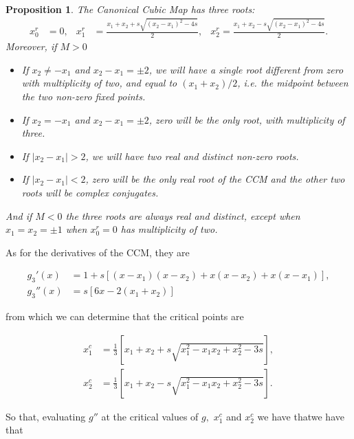 \documentclass[10pt,twoside,titlepage]{book}
\numberwithin{equation}{chapter}
\numberwithin{figure}{chapter}
\numberwithin{table}{chapter}
\theoremstyle{plain}%
\newtheorem{prop}[thm]{Proposition}
\theoremstyle{definition}
\theoremstyle{remark}
\begin{document}
\begin{prop}
	The Canonical Cubic Map has three roots:
	\begin{equation}
		\begin{aligned}
			x_0^r&=0, & x_1^r&=\frac{x_1+x_2+s\sqrt{(x_2-x_1)^2-4s}}{2}, & x_2^r=\frac{x_1+x_2-s\sqrt{(x_2-x_1)^2-4s}}{2}.
		\end{aligned}
	\end{equation}
	Moreover, if $M>0$
	\begin{itemize}
		\item If $x_2\neq-x_1$ and $x_2-x_1=\pm2$, we will have a single root different from zero with multiplicity of two, and equal to $(x_1+x_2)/2$, i.e. the midpoint between the two non-zero fixed points.
		\item If $x_2=-x_1$ and $x_2-x_1=\pm2$, zero will be the only root, with multiplicity of three.
		\item If $\vert x_2-x_1\vert>2$, we will have two real and distinct non-zero roots.
		\item If $\vert x_2-x_1\vert<2$, zero will be the only real root of the CCM and the other two roots will be complex conjugates.
	\end{itemize}
	And if $M<0$ the three roots are always real and distinct, except when $x_1=x_2=\pm1$ when $x_0^r=0$ has multiplicity of two.
\end{prop}

As for the derivatives of the CCM, they are

\begin{equation}
	\begin{aligned}
		g_3'(x)&=1+s\left[(x-x_1)(x-x_2)+x(x-x_2)+x(x-x_1)\right],\\
		g_3''(x)&=s\left[6x-2(x_1+x_2)\right]
	\end{aligned}
\end{equation}

from which we can determine that the critical points are

\begin{equation}
	\begin{aligned}
		x_1^c&= \frac{1}{3}\left[x_1+x_2+s\sqrt{x_1^2-x_1x_2+x_2^2-3s}\right],\\
		x_2^c&= \frac{1}{3}\left[x_1+x_2-s\sqrt{x_1^2-x_1x_2+x_2^2-3s}\right].
	\end{aligned}
\end{equation}

So that, evaluating $g''$ at the critical values of $g,$ $x_1^c$ and  $x_2^c$ we have thatwe have that
\end{document}

